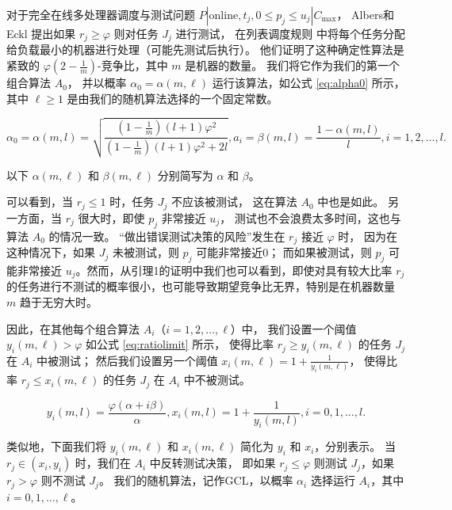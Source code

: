 对于完全在线多处理器调度与测试问题 \( P | \text{online}, t_j, 0 \leq p_j \leq u_j | C_{\max} \)，
Albers和Eckl\cite{albers2021explorable} 提出如果 \( r_j \geq \varphi \) 则对任务 \( J_j \) 进行测试，
在列表调度规则 \cite{graham1966bounds} 中将每个任务分配给负载最小的机器进行处理（可能先测试后执行）。
他们证明了这种确定性算法是紧致的 \( \varphi(2 - \frac{1}{m}) \)-竞争比，其中 \( m \) 是机器的数量。
我们将它作为我们的第一个组合算法 \( A_0 \)，
并以概率 \( \alpha_0 = \alpha(m, \ell) \) 运行该算法，如公式 \ref{eq:alpha0} 所示，
其中 \( \ell \geq 1 \) 是由我们的随机算法选择的一个固定常数。

\begin{equation}
    \alpha_0 = \alpha(m,l)
    = \sqrt{\dfrac{(1-\frac 1m)(l+1)\varphi^2}{(1-\frac 1m)(l+1)\varphi^2+2l}},
    a_i = \beta(m,l) = \dfrac{1-\alpha(m,l)}{l}, i = 1,2,\dots,l.
    \label{eq:alpha0}
\end{equation}

以下 \( \alpha(m, \ell) \) 和 \( \beta(m, \ell) \) 分别简写为 \( \alpha \) 和 \( \beta \)。

可以看到，当 \( r_j \leq 1 \) 时，任务 \( J_j \) 不应该被测试，
这在算法 \( A_0 \) 中也是如此。
另一方面，当 \( r_j \) 很大时，即使 \( p_j \) 非常接近 \( u_j \)，
测试也不会浪费太多时间，这也与算法 \( A_0 \) 的情况一致。
“做出错误测试决策的风险”发生在 \( r_j \) 接近 \( \varphi \) 时，
因为在这种情况下，如果 \( J_j \) 未被测试，则 \( p_j \) 可能非常接近0；
而如果被测试，则 \( p_j \) 可能非常接近 \( u_j \)。然而，从引理1的证明中我们也可以看到，即使对具有较大比率 \( r_j \) 的任务进行不测试的概率很小，也可能导致期望竞争比无界，特别是在机器数量 \( m \) 趋于无穷大时。

因此，在其他每个组合算法 \( A_i \)（\( i = 1, 2, \ldots, \ell \)）中，
我们设置一个阈值 \( y_i(m, \ell) > \varphi \) 如公式 \ref{eq:ratiolimit} 所示，
使得比率 \( r_j \geq y_i(m, \ell) \) 的任务 \( J_j \) 在 \( A_i \) 中被测试；
然后我们设置另一个阈值 \( x_i(m, \ell) = 1 + \frac{1}{y_i(m, \ell)} \)，
使得比率 \( r_j \leq x_i(m, \ell) \) 的任务 \( J_j \) 在 \( A_i \) 中不被测试。

\begin{equation}
    y_i(m,l) = \dfrac{\varphi(\alpha+i\beta)}{\alpha},
    x_i(m,l) = 1 + \dfrac 1{y_i(m,l)},
    i = 0,1,\dots,l.
    \label{eq:ratiolimit}
\end{equation}

类似地，下面我们将 \( y_i(m, \ell) \) 和 \( x_i(m, \ell) \) 简化为 \( y_i \) 和 \( x_i \)，分别表示。
当 \( r_j \in (x_i, y_i) \) 时，我们在 \( A_i \) 中反转测试决策，
即如果 \( r_j \leq \varphi \) 则测试 \( J_j \)，如果 \( r_j > \varphi \) 则不测试 \( J_j \)。
我们的随机算法，记作GCL，以概率 \( \alpha_i \) 选择运行 \( A_i \)，其中 \( i = 0, 1, \ldots, \ell \)。


